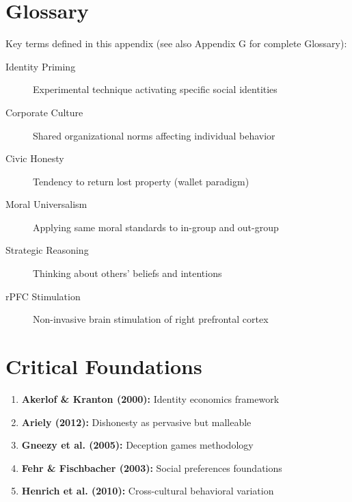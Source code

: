 \section{Glossary}

Key terms defined in this appendix (see also Appendix G for complete Glossary):

\begin{description}
    \item[Identity Priming] Experimental technique activating specific social identities
    \item[Corporate Culture] Shared organizational norms affecting individual behavior
    \item[Civic Honesty] Tendency to return lost property (wallet paradigm)
    \item[Moral Universalism] Applying same moral standards to in-group and out-group
    \item[Strategic Reasoning] Thinking about others' beliefs and intentions
    \item[rPFC Stimulation] Non-invasive brain stimulation of right prefrontal cortex
\end{description}

\section{Critical Foundations}

\begin{enumerate}
    \item \textbf{Akerlof \& Kranton (2000):} Identity economics framework
    \item \textbf{Ariely (2012):} Dishonesty as pervasive but malleable
    \item \textbf{Gneezy et al. (2005):} Deception games methodology
    \item \textbf{Fehr \& Fischbacher (2003):} Social preferences foundations
    \item \textbf{Henrich et al. (2010):} Cross-cultural behavioral variation
\end{enumerate}


